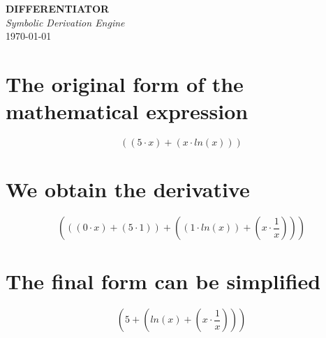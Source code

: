 \documentclass[12pt, letterpaper, twoside]{article}
\begin{document}
\begin{titlepage}
  \centering
  \vspace*{0.25\textheight}
  {\fontsize{48}{60}\bfseries\color{accent}DIFFERENTIATOR\\}
  \vspace{1.5em}
  {\Large\itshape Symbolic Derivation Engine}\\
  \vspace{2em}
  \quad \today\\
  \vfill
\end{titlepage}
\newpage

\section{The original form of the mathematical expression}
	\[((5 \cdot x) + (x \cdot ln( x)))\]
\section{We obtain the derivative}
	\[(((0 \cdot x) + (5 \cdot 1)) + ((1 \cdot ln( x)) + (x \cdot \frac{1}{x})))\]
\section{The final form can be simplified}
	\[(5 + (ln( x) + (x \cdot \frac{1}{x})))\]
\end{document}
